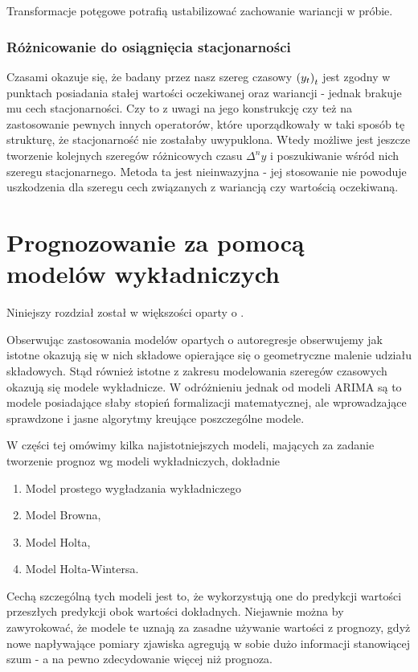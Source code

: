 \documentclass[10pt,a4paper]{book}
\begin{document}
Transformacje potęgowe potrafią ustabilizować zachowanie wariancji w próbie.

\subsection{Różnicowanie do osiągnięcia stacjonarności}

Czasami okazuje się, że badany przez nasz szereg czasowy $\left( {y_t} \right)_{t}^{} $ jest zgodny w punktach posiadania stałej wartości oczekiwanej oraz wariancji - jednak brakuje mu cech stacjonarności. Czy to z uwagi na jego konstrukcję czy też na zastosowanie pewnych innych operatorów, które uporządkowały w taki sposób tę strukturę, że stacjonarność nie zostałaby uwypuklona. Wtedy możliwe jest jeszcze tworzenie kolejnych szeregów różnicowych czasu $\Delta^n y$ i poszukiwanie wśród nich szeregu stacjonarnego. Metoda ta jest nieinwazyjna - jej stosowanie nie powoduje uszkodzenia dla szeregu cech związanych z wariancją czy wartością oczekiwaną.

\chapter{Prognozowanie za pomocą modelów wykładniczych}

Niniejszy rozdział został w większości oparty o \citep{montgomery2015introduction,zagdanski2016analiza}.

Obserwując zastosowania modelów opartych o autoregresje obserwujemy jak istotne okazują się w nich składowe opierające się o geometryczne malenie udziału składowych. Stąd również istotne z zakresu modelowania szeregów czasowych okazują się modele wykładnicze. W odróżnieniu jednak od modeli ARIMA są to modele posiadające słaby stopień formalizacji matematycznej, ale wprowadzające sprawdzone i jasne algorytmy kreujące poszczególne modele.

W części tej omówimy kilka najistotniejszych modeli, mających za zadanie tworzenie prognoz wg modeli wykładniczych, dokładnie
\begin{enumerate}
\item Model prostego wygładzania wykładniczego
\item Model Browna,
\item Model Holta,
\item Model Holta-Wintersa.
\end{enumerate}

Cechą szczególną tych modeli jest to, że wykorzystują one do predykcji wartości przeszłych predykcji obok wartości dokładnych. Niejawnie można by zawyrokować, że modele te uznają za zasadne używanie wartości z prognozy, gdyż nowe napływające pomiary zjawiska agregują w sobie dużo informacji stanowiącej szum - a na pewno zdecydowanie więcej niż prognoza.
\end{document}
